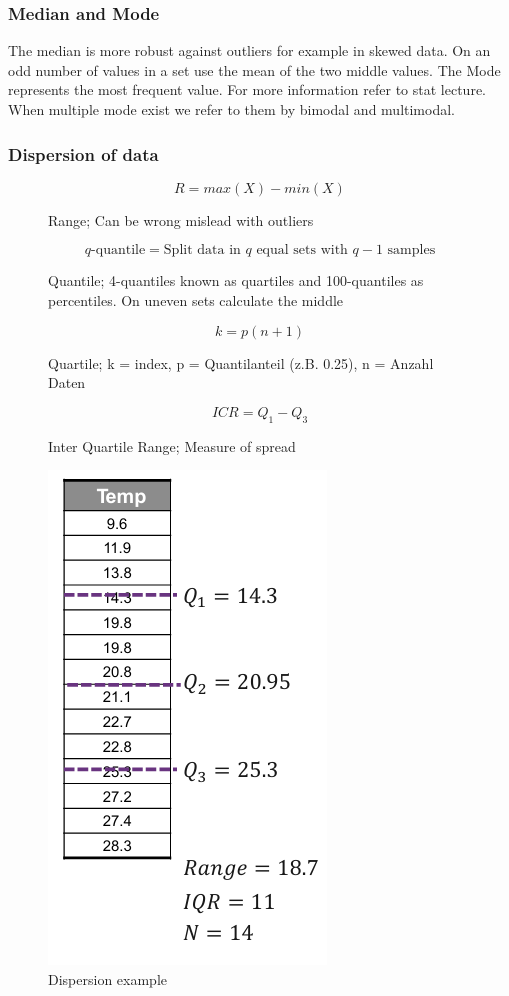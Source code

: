 \documentclass[../Main.tex]{subfiles}
\begin{document}
\subsubsection{Median and Mode}
The median is more robust against outliers for example in skewed data.
On an odd number of values in a set use the mean of the two middle values.
The Mode represents the most frequent value. For more information refer to stat lecture.
When multiple mode exist we refer to them by bimodal and multimodal.
\subsubsection{Dispersion of data}
\begin{figure}[H]
    \begin{equation}
        R = max(X) - min(X)
    \end{equation}
    \caption{Range; Can be wrong mislead with outliers}
\end{figure}

\begin{figure}[H]
    \begin{equation}
        q\text{-quantile} = \text{Split data in } q \text{ equal sets with } q-1 \text{ samples}
    \end{equation}
    \caption{Quantile; 4-quantiles known as quartiles and 100-quantiles as percentiles. On uneven sets calculate the middle}
\end{figure}

\begin{figure}[H]
    \begin{equation}
        k = p (n+1)
    \end{equation}
    \caption{Quartile; k = index, p = Quantilanteil (z.B. 0.25), n = Anzahl Daten}
\end{figure}

\begin{figure}[H]
    \begin{equation}
        ICR = Q_1 - Q_3
    \end{equation}
    \caption{Inter Quartile Range; Measure of spread}
\end{figure}

\begin{figure}[H]
    \centering
    \includegraphics[width=0.25\linewidth]{Images/datan/dispersion.png}
    \caption{Dispersion example}
\end{figure}
\end{document}
